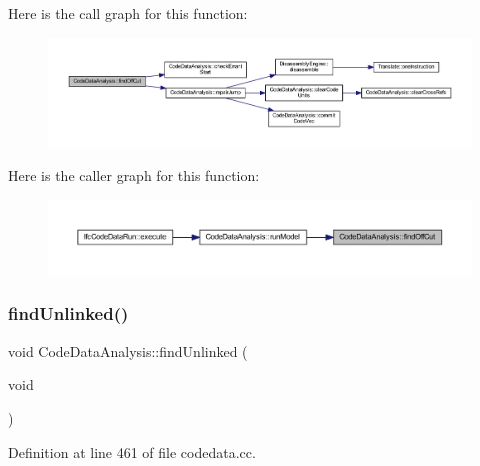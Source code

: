 Here is the call graph for this function\+:
\nopagebreak
\begin{figure}[H]
\begin{center}
\leavevmode
\includegraphics[width=350pt]{class_code_data_analysis_ad069e36b39959763921b330663387d3c_cgraph}
\end{center}
\end{figure}
Here is the caller graph for this function\+:
\nopagebreak
\begin{figure}[H]
\begin{center}
\leavevmode
\includegraphics[width=350pt]{class_code_data_analysis_ad069e36b39959763921b330663387d3c_icgraph}
\end{center}
\end{figure}
\mbox{\label{class_code_data_analysis_a0e11a53182ac0d58d9fc3d9e8231e61e}} 
\subsubsection{\texorpdfstring{findUnlinked()}{findUnlinked()}}
{\footnotesize\ttfamily void Code\+Data\+Analysis\+::find\+Unlinked (\begin{DoxyParamCaption}\item[{void}]{ }\end{DoxyParamCaption})}



Definition at line 461 of file codedata.\+cc.

